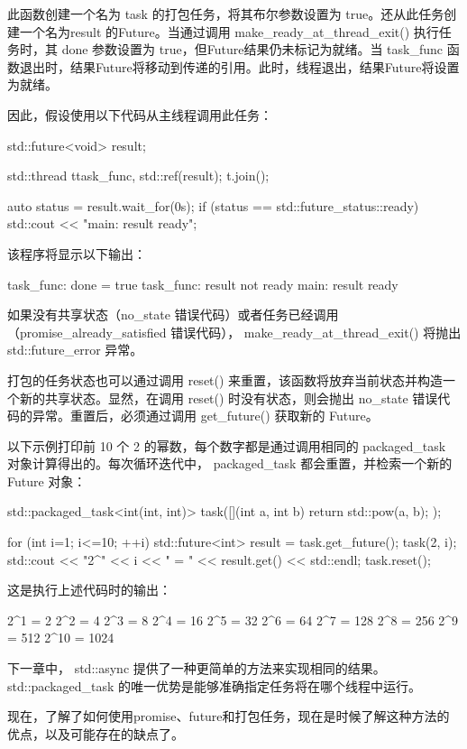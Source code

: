 此函数创建一个名为 task 的打包任务，将其布尔参数设置为 true。还从此任务创建一个名为result 的Future。当通过调用 make\_ready\_at\_thread\_exit() 执行任务时，其 done 参数设置为 true，但Future结果仍未标记为就绪。当 task\_func 函数退出时，结果Future将移动到传递的引用。此时，线程退出，结果Future将设置为就绪。

因此，假设使用以下代码从主线程调用此任务：

\begin{cpp}
std::future<void> result;

std::thread t{task_func, std::ref(result)};
t.join();

auto status = result.wait_for(0s);
if (status == std::future_status::ready)
    std::cout << "main: result ready\n";
\end{cpp}

该程序将显示以下输出：

\begin{shell}
task_func: done = true
task_func: result not ready
main: result ready
\end{shell}

如果没有共享状态（no\_state 错误代码）或者任务已经调用（promise\_already\_satisfied 错误代码）， make\_ready\_at\_thread\_exit() 将抛出 std::future\_error 异常。

打包的任务状态也可以通过调用 reset() 来重置，该函数将放弃当前状态并构造一个新的共享状态。显然，在调用 reset() 时没有状态，则会抛出 no\_state 错误代码的异常。重置后，必须通过调用 get\_future() 获取新的 Future。

以下示例打印前 10 个 2 的幂数，每个数字都是通过调用相同的 packaged\_task 对象计算得出的。每次循环迭代中， packaged\_task 都会重置，并检索一个新的 Future 对象：

\begin{cpp}
std::packaged_task<int(int, int)> task([](int a, int b){
    return std::pow(a, b);
});

for (int i=1; i<=10; ++i) {
    std::future<int> result = task.get_future();
    task(2, i);
    std::cout << "2^" << i << " = "
              << result.get() << std::endl;
    task.reset();
}
\end{cpp}

这是执行上述代码时的输出：

\begin{shell}
2^1 = 2
2^2 = 4
2^3 = 8
2^4 = 16
2^5 = 32
2^6 = 64
2^7 = 128
2^8 = 256
2^9 = 512
2^10 = 1024
\end{shell}

下一章中， std::async 提供了一种更简单的方法来实现相同的结果。 std::packaged\_task 的唯一优势是能够准确指定任务将在哪个线程中运行。

现在，了解了如何使用promise、future和打包任务，现在是时候了解这种方法的优点，以及可能存在的缺点了。